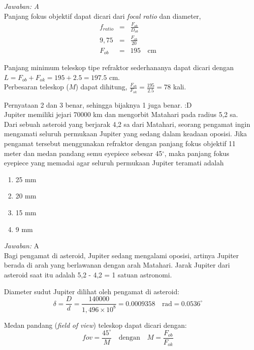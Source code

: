 \documentclass[11pt,fleqn]{exam}
\begin{document}
\begin{questions}
\textit{Jawaban: A}\\

Panjang fokus objektif dapat dicari dari \textit{focal ratio} dan diameter,
\begin{eqnarray*}
f_{ratio} &=& \frac{F_{ob}}{D_{ob}}\\
9,75 &=& \frac{F_{ob}}{20}\\
F_{ob} &=& 195 \quad \text{cm}
\end{eqnarray*}

Panjang minimum teleskop tipe refraktor sederhananya dapat dicari dengan $L = F_{ob} + F_{ok} = 195 + 2.5 = 197.5$ cm.\\

Perbesaran teleskop ($M$) dapat dihitung, $\frac{F_{ob}}{F_{ok}} = \frac{195}{2.5} = 78 $ kali.

Pernyataan 2 dan 3 benar, sehingga bijaknya 1 juga benar. :D\\


\question Jupiter memiliki jejari 70000 km dan mengorbit Matahari pada radius 5,2 sa. Dari sebuah asteroid yang berjarak 4,2 sa dari Matahari, seorang pengamat ingin mengamati seluruh permukaan Jupiter yang sedang dalam keadaan oposisi. Jika pengamat tersebut menggunakan refraktor dengan panjang fokus objektif 11 meter dan medan pandang semu eyepiece sebesar 45$^{\circ}$, maka panjang fokus eyepiece yang memadai agar seluruh permukaan Jupiter teramati adalah
\begin{enumerate}
\item 25 mm
\item 20 mm
\item 15 mm
\item 9 mm
\end{enumerate}

\textit{Jawaban: } A\\

Bagi pengamat di asteroid, Jupiter sedang mengalami oposisi, artinya Jupiter berada di arah yang berlawanan dengan arah Matahari. Jarak Jupiter dari asteroid saat itu adalah 5,2 - 4,2 = 1 satuan astronomi.

Diameter sudut Jupiter dilihat oleh pengamat di asteroid:
\begin{equation*}
\delta = \frac{D}{d} = \frac{140000}{1,496 \times 10^{8}} = 0.0009358 \quad \text{rad} = 0.0536^{\circ}
\end{equation*}
 
Medan pandang (\textit{field of view}) teleskop dapat dicari dengan:
\begin{equation*}
\textit{fov} = \frac{45^{\circ}}{M} \quad \text{dengan} \quad M = \frac{F_{ob}}{F_{ok}}
\end{equation*} 


\end{questions}
\end{document}
